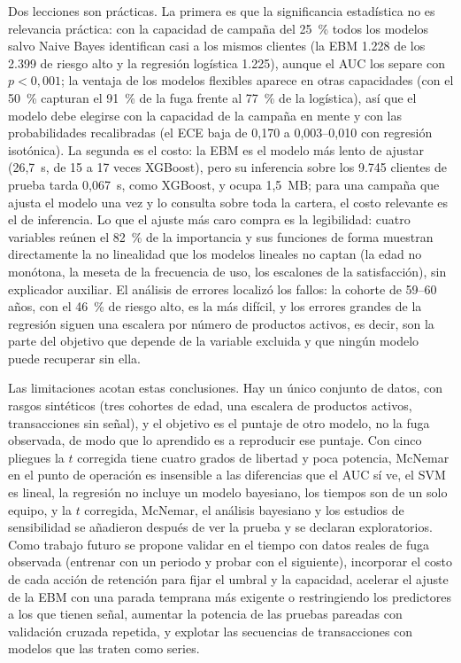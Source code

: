 Dos lecciones son prácticas. La primera es que la significancia estadística no es relevancia práctica: con la
capacidad de campaña del 25~\% todos los modelos salvo Naive Bayes identifican casi a los mismos clientes (la
EBM 1.228 de los 2.399 de riesgo alto y la regresión logística 1.225), aunque el AUC los separe con
$p < 0{,}001$; la ventaja de los modelos flexibles aparece en otras capacidades (con el 50~\% capturan el 91~\%
de la fuga frente al 77~\% de la logística), así que el modelo debe elegirse con la capacidad de la campaña en
mente y con las probabilidades recalibradas (el ECE baja de 0,170 a 0,003--0,010 con regresión isotónica). La
segunda es el costo: la EBM es el modelo más lento de ajustar (26,7~s, de 15 a 17 veces XGBoost), pero su
inferencia sobre los 9.745 clientes de prueba tarda 0,067~s, como XGBoost, y ocupa 1,5~MB; para una campaña
que ajusta el modelo una vez y lo consulta sobre toda la cartera, el costo relevante es el de inferencia. Lo que
el ajuste más caro compra es la legibilidad: cuatro variables reúnen el 82~\% de la importancia y sus funciones
de forma muestran directamente la no linealidad que los modelos lineales no captan (la edad no monótona, la
meseta de la frecuencia de uso, los escalones de la satisfacción), sin explicador auxiliar. El análisis de
errores localizó los fallos: la cohorte de 59--60 años, con el 46~\% de riesgo alto, es la más difícil, y los
errores grandes de la regresión siguen una escalera por número de productos activos, es decir, son la parte del
objetivo que depende de la variable excluida y que ningún modelo puede recuperar sin ella.

Las limitaciones acotan estas conclusiones. Hay un único conjunto de datos, con rasgos sintéticos (tres
cohortes de edad, una escalera de productos activos, transacciones sin señal), y el objetivo es el puntaje de
otro modelo, no la fuga observada, de modo que lo aprendido es a reproducir ese puntaje. Con cinco pliegues la
$t$ corregida tiene cuatro grados de libertad y poca potencia, McNemar en el punto de operación es insensible a
las diferencias que el AUC sí ve, el SVM es lineal, la regresión no incluye un modelo bayesiano, los tiempos son
de un solo equipo, y la $t$ corregida, McNemar, el análisis bayesiano y los estudios de sensibilidad se
añadieron después de ver la prueba y se declaran exploratorios. Como trabajo futuro se propone validar en el
tiempo con datos reales de fuga observada (entrenar con un periodo y probar con el siguiente), incorporar el
costo de cada acción de retención para fijar el umbral y la capacidad, acelerar el ajuste de la EBM con una
parada temprana más exigente o restringiendo los predictores a los que tienen señal, aumentar la potencia de las
pruebas pareadas con validación cruzada repetida, y explotar las secuencias de transacciones con modelos que las
traten como series.
